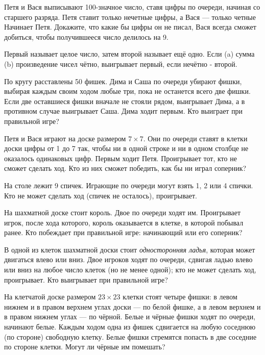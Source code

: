 \documentclass{article}
\begin{document}
\begin{enumerate_boxed}
        \item Петя и Вася выписывают 100-значное число, ставя цифры по очереди, начиная со старшего разряда.
        Петя ставит только нечетные цифры, а Вася — только четные Начинает Петя.
        Докажите, что какие бы цифры он не писал, Вася всегда сможет добиться, чтобы получившееся число делилось на 9.

        \item Первый называет целое число, затем второй называет ещё одно.
        Если (a) сумма (b) произведение чисел чётно, выигрывает первый, если нечётно - второй.

        \item По кругу расставлены 50 фишек.
        Дима и Саша по очереди убирают фишки, выбирая каждым своим ходом любые три, пока не останется всего две фишки.
        Если две оставшиеся фишки вначале не стояли рядом, выигрывает Дима, а в противном случае выигрывает Саша.
        Дима ходит первым.
        Кто выиграет при правильной игре?

        \item Петя и Вася играют на доске размером $7 \times 7$.
        Они по очереди ставят в клетки доски цифры от 1 до 7 так, чтобы ни в одной строке и ни в одном столбце не оказалось одинаковых цифр.
        Первым ходит Петя.
        Проигрывает тот, кто не сможет сделать ход.
        Кто из них сможет победить, как бы ни играл соперник?

        \item  На столе лежит 9 спичек.
        Играющие по очереди могут взять 1, 2 или 4 спички.
        Кто не может сделать ход (спичек не осталось), проигрывает.

        \item На шахматной доске стоит король.
        Двое по очереди ходят им.
        Проигрывает игрок, после хода которого, король оказывается в клетке, в которой побывал ранее.
        Кто побеждает при правильной игре: начинающий или его соперник?

        \item В одной из клеток шахматной доски стоит \textit{односторонняя ладья}, которая может двигаться влево или вниз.
        Двое игроков ходят по очереди, сдвигая ладью влево или вниз на любое число клеток (но не менее одной); кто не может сделать ход, проигрывает.
        Кто выигрывает при правильной игре?

        \item На клетчатой доске размером $23 \times 23$ клетки стоят четыре фишки: в левом нижнем и в правом верхнем углах доски — по белой фишке, а в левом верхнем и в правом нижнем углах — по чёрной.
        Белые и чёрные фишки ходят по очереди, начинают белые.
        Каждым ходом одна из фишек сдвигается на любую соседнюю (по стороне) свободную клетку.
        Белые фишки стремятся попасть в две соседние по стороне клетки.
        Могут ли чёрные им помешать?


\end{enumerate_boxed}
\end{document}
